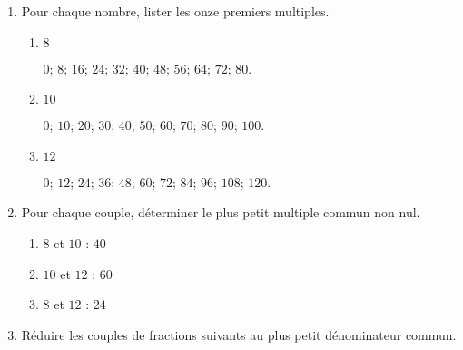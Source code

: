 \begin{corrige}
    \begin{enumerate}
        \item Pour chaque nombre, lister les onze premiers multiples.
        
            \begin{enumerate}
                \item $8$  
                
                {\red $0$; $8$;  $16$; $24$; $32$; $40$; $48$; $56$; $64$; $72$; $80$.}
                \item $10$ 
                
                {\red $0$; $10$; $20$; $30$; $40$; $50$; $60$; $70$; $80$; $90$; $100$.}
                \item $12$ 
                
                {\red $0$; $12$; $24$; $36$; $48$; $60$; $72$; $84$; $96$; $108$; $120$.}
            \end{enumerate}  
        \setcounter{enumi}{1}
        \item Pour chaque couple, déterminer le plus petit multiple commun non nul.

            \begin{enumerate}
                \item $8$ et $10$  {\red : $40$}
                \item $10$ et $12$ {\red : $60$}
                \item $8$ et $12$  {\red : $24$}
            \end{enumerate}           
        \setcounter{enumi}{2}
        \item Réduire les couples de fractions suivants au plus petit dénominateur commun.
        
            \begin{enumerate}
            \end{enumerate}
    \end{enumerate}
\end{corrige}

